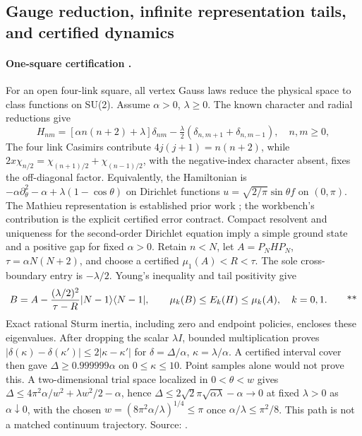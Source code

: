 \subsection{Gauge reduction, infinite representation tails, and certified dynamics}
\label{early:gauge}

\paragraph{One-square certification \workstar.}
For an open four-link square, all vertex Gauss laws reduce the physical space
to class functions on SU(2).  Assume \(\alpha>0\), \(\lambda\ge0\).
The known character and radial reductions give
\begin{equation}
 H_{nm}=[\alpha n(n+2)+\lambda]\delta_{nm}
 -\tfrac\lambda2(\delta_{n,m+1}+\delta_{n,m-1}),\quad n,m\ge0,
 \label{early:jacobi}
\end{equation}
The four link Casimirs contribute \(4j(j+1)=n(n+2)\), while
\(2x\chi_{n/2}=\chi_{(n+1)/2}+\chi_{(n-1)/2}\), with the negative-index
character absent, fixes the off-diagonal factor.
Equivalently, the Hamiltonian is
\(-\alpha\partial_\theta^2-\alpha+\lambda(1-\cos\theta)\)
on Dirichlet functions \(u=\sqrt{2/\pi}\sin\theta f\) on \((0,\pi)\).
The Mathieu representation is established prior work \cite{bauer2023basis}; the workbench's
contribution is the explicit certified error contract.  Compact resolvent
and uniqueness for the second-order Dirichlet equation imply a simple ground
state and a positive gap for fixed \(\alpha>0\).  Retain \(n<N\), let
\(A=P_NHP_N\), \(\tau=\alpha N(N+2)\), and choose a certified
\(\mu_1(A)<R<\tau\).  The sole cross-boundary entry is \(-\lambda/2\).
Young's inequality and tail positivity give
\begin{equation}
 B=A-\frac{(\lambda/2)^2}{\tau-R}|N-1\rangle\langle N-1|,
 \qquad \mu_k(B)\le E_k(H)\le\mu_k(A),\quad k=0,1.
 \qquad\text{**}\label{early:onetail}
\end{equation}
Exact rational Sturm inertia, including zero and endpoint policies, encloses
these eigenvalues.  After dropping the scalar \(\lambda I\), bounded
multiplication proves \(|\delta(\kappa)-\delta(\kappa')|\le2|\kappa-\kappa'|\)
for \(\delta=\Delta/\alpha\), \(\kappa=\lambda/\alpha\).  A certified interval
cover then gave \(\Delta\ge0.999999\alpha\) on \(0\le\kappa\le10\).
Point samples alone would not prove this.  A two-dimensional trial space
localized in \(0<\theta<w\) gives
\(\Delta\le4\pi^2\alpha/w^2+\lambda w^2/2-\alpha\), hence
\(\Delta\le2\sqrt2\pi\sqrt{\alpha\lambda}-\alpha\to0\) at fixed
\(\lambda>0\) as \(\alpha\downarrow0\), with the chosen
\(w=(8\pi^2\alpha/\lambda)^{1/4}\le\pi\) once
\(\alpha/\lambda\le\pi^2/8\).  This path is not a matched
continuum trajectory.  Source: .

